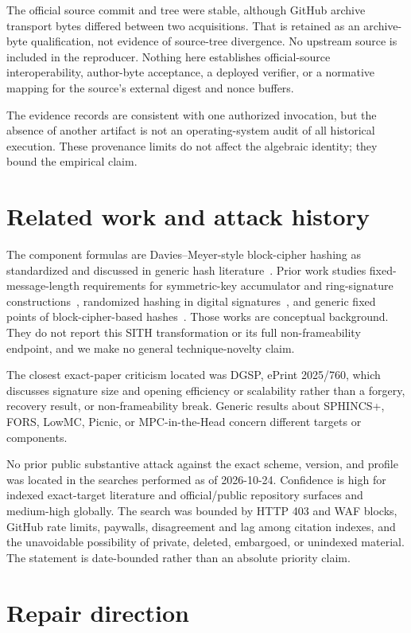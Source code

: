 \documentclass[10pt,a4paper]{article}
\begin{document}
The official source commit and tree were stable, although GitHub archive
transport bytes differed between two acquisitions. That is retained as an
archive-byte qualification, not evidence of source-tree divergence. No
upstream source is included in the reproducer. Nothing here establishes
official-source interoperability, author-byte acceptance, a deployed
verifier, or a normative mapping for the source's external digest and nonce
buffers.

The evidence records are consistent with one authorized invocation, but the
absence of another artifact is not an operating-system audit of all historical
execution. These provenance limits do not affect the algebraic identity; they
bound the empirical claim.

\section{Related work and attack history}

The component formulas are Davies--Meyer-style block-cipher hashing as
standardized and discussed in generic hash literature~\cite{iso10118}. Prior
work studies fixed-message-length requirements for symmetric-key accumulator
and ring-signature constructions~\cite{derler2018}, randomized hashing in
digital signatures~\cite{gauravaram2009}, and generic fixed points of
block-cipher-based hashes~\cite{aumasson2009}. Those works are conceptual
background. They do not report this SITH transformation or its full
non-frameability endpoint, and we make no general technique-novelty claim.

The closest exact-paper criticism located was DGSP, ePrint 2025/760, which
discusses signature size and opening efficiency or scalability rather than a
forgery, recovery result, or non-frameability break. Generic results about
SPHINCS+, FORS, LowMC, Picnic, or MPC-in-the-Head concern different targets or
components.

No prior public substantive attack against the exact scheme, version, and
profile was located in the searches performed as of 2026-10-24. Confidence is
high for indexed exact-target literature and official/public repository
surfaces and medium-high globally. The search was bounded by HTTP 403 and WAF
blocks, GitHub rate limits, paywalls, disagreement and lag among citation
indexes, and the unavoidable possibility of private, deleted, embargoed, or
unindexed material. The statement is date-bounded rather than an absolute
priority claim.

\section{Repair direction}
\end{document}
